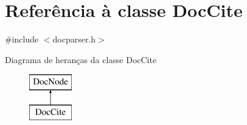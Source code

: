 \hypertarget{class_doc_cite}{\section{Referência à classe Doc\-Cite}
\label{class_doc_cite}
}


{\ttfamily \#include $<$docparser.\-h$>$}

Diagrama de heranças da classe Doc\-Cite\begin{figure}[H]
\begin{center}
\leavevmode
\includegraphics[height=2.000000cm]{class_doc_cite}
\end{center}
\end{figure}
